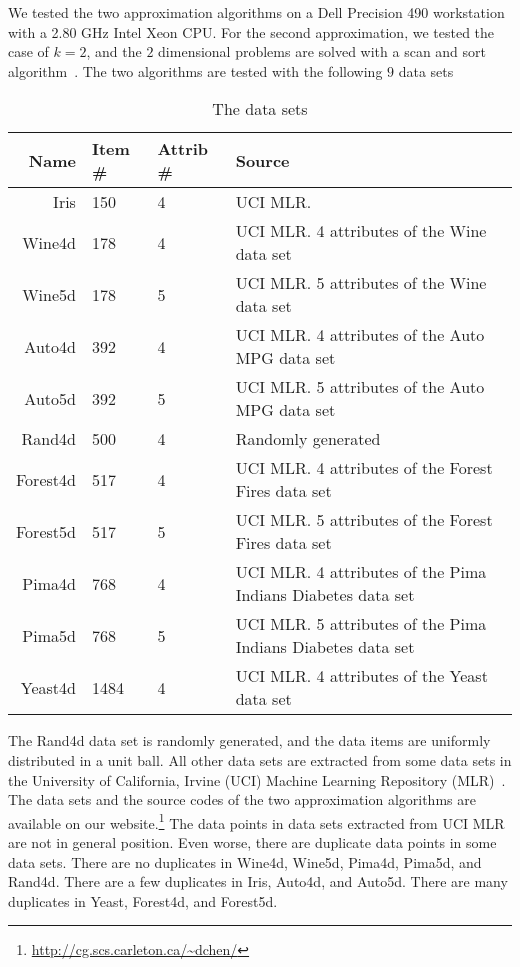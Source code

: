 \documentclass{patmorin}
\begin{document}
We tested the two approximation algorithms on a Dell Precision 490 workstation with a 2.80 GHz Intel Xeon CPU. For the second approximation, we tested the case of $k=2$, and the $2$ dimensional problems are solved with a scan and sort algorithm~\cite{Rousseeuw98}. The two algorithms are tested with the following $9$ data sets
\begin{table}[!htb]
  \centering
  \begin{tabular}[center]{|r|l|l|p{8cm}|}
    \hline
    Name & Item \# & Attrib \# & Source \\
    \hline
    Iris &  150 & 4 & UCI MLR. \\
    Wine4d &  178 & 4 & UCI MLR. 4 attributes of the Wine data set\\
    Wine5d &  178 & 5 & UCI MLR. 5 attributes of the Wine data set\\
    Auto4d &  392 & 4 & UCI MLR. 4 attributes of the Auto MPG data set\\
    Auto5d &  392 & 5 & UCI MLR. 5 attributes of the Auto MPG data set\\
    Rand4d &  500 & 4 & Randomly generated\\
    Forest4d &  517 & 4 & UCI MLR. 4 attributes of the Forest Fires data set~\cite{Cortez07}\\
    Forest5d &  517 & 5 & UCI MLR. 5 attributes of the Forest Fires data set~\cite{Cortez07}\\
    Pima4d &  768 & 4 & UCI MLR. 4 attributes of the Pima Indians Diabetes data set\\
    Pima5d &  768 & 5 & UCI MLR. 5 attributes of the Pima Indians Diabetes data set\\
    Yeast4d &  1484 & 4 & UCI MLR. 4 attributes of the Yeast data set\\
    \hline
  \end{tabular}
  \caption{The data sets}
  \label{tab:datasets}
\end{table}

The Rand4d data set is randomly generated, and the data items are uniformly distributed in a unit ball. All other data sets are extracted from some data sets in the University of California, Irvine (UCI) Machine Learning Repository (MLR)~\cite{ucimlr07}. The data sets and the source codes of the two approximation algorithms are available on our website.\footnote{\url{http://cg.scs.carleton.ca/~dchen/}} The data points in data sets extracted from UCI MLR are not in general position. Even worse, there are duplicate data points in some data sets. There are no duplicates in Wine4d, Wine5d, Pima4d, Pima5d, and Rand4d. There are a few duplicates in Iris, Auto4d, and Auto5d. There are many duplicates in Yeast, Forest4d, and Forest5d.
\end{document}
